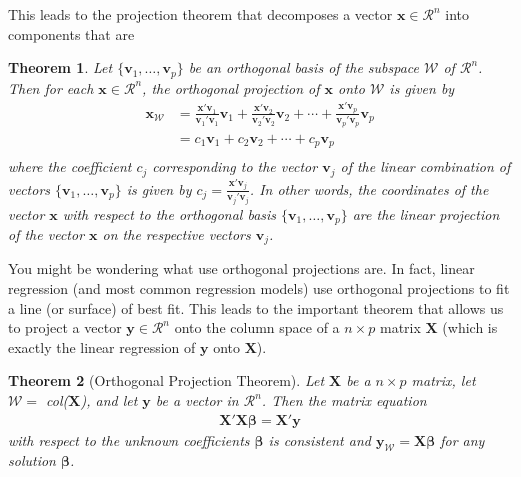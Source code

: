 \documentclass[
]{book}
\newtheorem{theorem}{Theorem}[chapter]
\theoremstyle{definition}
\theoremstyle{definition}
\theoremstyle{definition}
\theoremstyle{definition}
\theoremstyle{remark}
\begin{document}
This leads to the projection theorem that decomposes a vector \(\mathbf{x} \in \mathcal{R}^n\) into components that are

\begin{theorem}
Let \(\{ \mathbf{v}_1, \ldots, \mathbf{v}_p \}\) be an orthogonal basis of the subspace \(\mathcal{W}\) of \(\mathcal{R}^n\). Then for each \(\mathbf{x} \in \mathcal{R}^n\), the orthogonal projection of \(\mathbf{x}\) onto \(\mathcal{W}\) is given by
\[
\begin{aligned}
\mathbf{x}_{\mathcal{W}} & = \frac{\mathbf{x}'\mathbf{v}_1}{\mathbf{v}_1'\mathbf{v}_1} \mathbf{v}_1 + \frac{\mathbf{x}'\mathbf{v}_2}{\mathbf{v}_2'\mathbf{v}_2} \mathbf{v}_2 + \cdots +  \frac{\mathbf{x}'\mathbf{v}_p}{\mathbf{v}_p'\mathbf{v}_p} \mathbf{v}_p \\
& = c_1 \mathbf{v}_1 + c_2 \mathbf{v}_2 + \cdots + c_p \mathbf{v}_p \\
\end{aligned}
\]
where the coefficient \(c_j\) corresponding to the vector \(\mathbf{v}_j\) of the linear combination of vectors \(\{ \mathbf{v}_1, \ldots, \mathbf{v}_p \}\) is given by \(c_j = \frac{\mathbf{x}'\mathbf{v}_j}{\mathbf{v}_j'\mathbf{v}_j}\). In other words, the coordinates of the vector \(\mathbf{x}\) with respect to the orthogonal basis \(\{ \mathbf{v}_1, \ldots, \mathbf{v}_p \}\) are the linear projection of the vector \(\mathbf{x}\) on the respective vectors \(\mathbf{v}_j\).
\end{theorem}

You might be wondering what use orthogonal projections are. In fact, linear regression (and most common regression models) use orthogonal projections to fit a line (or surface) of best fit. This leads to the important theorem that allows us to project a vector \(\mathbf{y} \in \mathcal{R}^n\) onto the column space of a \(n \times p\) matrix \(\mathbf{X}\) (which is exactly the linear regression of \(\mathbf{y}\) onto \(\mathbf{X}\)).

\begin{theorem}[Orthogonal Projection Theorem]
\protect\hypertarget{thm:orthogonal-matrix-projection}{}\label{thm:orthogonal-matrix-projection}Let \(\mathbf{X}\) be a \(n \times p\) matrix, let \(\mathcal{W} =\) col(\(\mathbf{X}\)), and let \(\mathbf{y}\) be a vector in \(\mathcal{R}^n\). Then the matrix equation
\[
\begin{aligned}
\mathbf{X}'\mathbf{X} \boldsymbol{\beta} = \mathbf{X}' \mathbf{y}
\end{aligned}
\]
with respect to the unknown coefficients \(\boldsymbol{\beta}\) is consistent and \(\mathbf{y}_{\mathcal{W}} = \mathbf{X}\boldsymbol{\beta}\) for any solution \(\boldsymbol{\beta}\).
\end{theorem}
\end{document}

